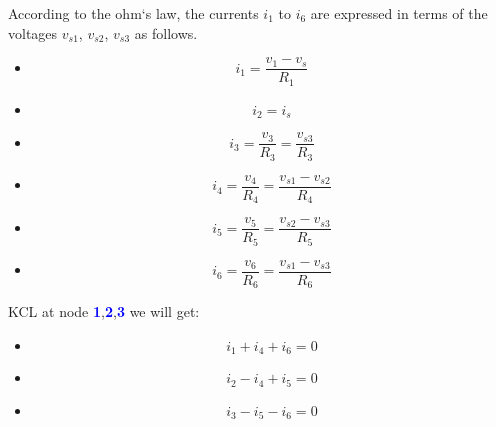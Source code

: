 \documentclass[a4 paper]{article}
\newcommand{\blue}[1]{\textcolor{blue}{#1}}
\numberwithin{equation}{section}
\newcommand{\0}{\mathbf{0}}
\begin{document}
According to the ohm`s law, the currents $i_1$ to $i_6$ are expressed in terms of the voltages $v_{s1}$, $v_{s2}$, $v_{s3}$ as follows. 
\begin{itemize} \itemsep1pt \parskip0pt  
  \item[] \hspace{6.6 cm}\begin{equation}i_1 = \frac{v_1-v_s}{R_1}\end{equation}
  \item[] \hspace{6.6 cm}\begin{equation}i_2 = i_s\end{equation}
  \item[] \hspace{6.6 cm}\begin{equation}i_3 = \frac{v_3}{R_3} = \frac{v_{s3}}{R_3}\end{equation}
  \item[] \hspace{6.6 cm}\begin{equation}i_4 = \frac{v_4}{R_4} = \frac{v_{s1}-v_{s2}}{R_4}\end{equation}
  \item[] \hspace{6.6 cm}\begin{equation}i_5 = \frac{v_5}{R_5} = \frac{v_{s2}-v_{s3}}{R_5}\end{equation}
  \item[] \hspace{6.6 cm}\begin{equation}i_6 = \frac{v_6}{R_6} = \frac{v_{s1}-v_{s3}}{R_6}\end{equation}
\end{itemize}

\vspace{8 mm}

KCL at node \blue{{\bf 1}},\blue{{\bf 2}},\blue{{\bf 3}} we will get:


\begin{itemize} \itemsep1pt \parskip0pt  
  \item[] \hspace{6.6 cm}\begin{equation}i_1 + i_4 + i_6 = 0\end{equation}
  \item[] \hspace{6.6 cm}\begin{equation}i_2 - i_4 + i_5 = 0\end{equation}
  \item[] \hspace{6.6 cm}\begin{equation}i_3 - i_5 - i_6 = 0\end{equation}
\end{itemize}
\end{document}
